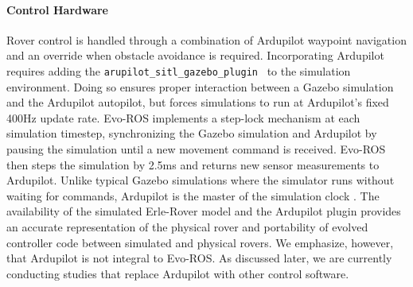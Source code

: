 \paragraph{Control Hardware}
Rover control is handled through a combination of Ardupilot waypoint navigation and an override when obstacle avoidance is required.  
%
Incorporating Ardupilot requires adding the {\tt arupilot\_sitl\_gazebo\_plugin}~\cite{ardupilot.sitl.plugin} to the simulation environment.  
%
Doing so ensures proper interaction between a Gazebo simulation and the Ardupilot autopilot,
but forces simulations to run at Ardupilot's fixed 400Hz update rate.
%
Evo-ROS implements a step-lock mechanism at each simulation timestep, synchronizing the Gazebo simulation and Ardupilot by pausing the simulation until a new movement command is received.  
%
Evo-ROS then steps the simulation by 2.5ms and returns
new sensor measurements to Ardupilot.
%
Unlike typical Gazebo simulations where the simulator runs without waiting for commands, 
Ardupilot is the master of the simulation clock \cite{erle.simulation}. 
%
The availability of the simulated Erle-Rover model and the Ardupilot plugin provides an accurate representation of the physical rover and portability of evolved controller code between simulated and physical rovers. 
%
%
We emphasize, however, that Ardupilot is not integral to Evo-ROS.  As discussed later, we are currently conducting studies that replace Ardupilot with other control software.
%


    

